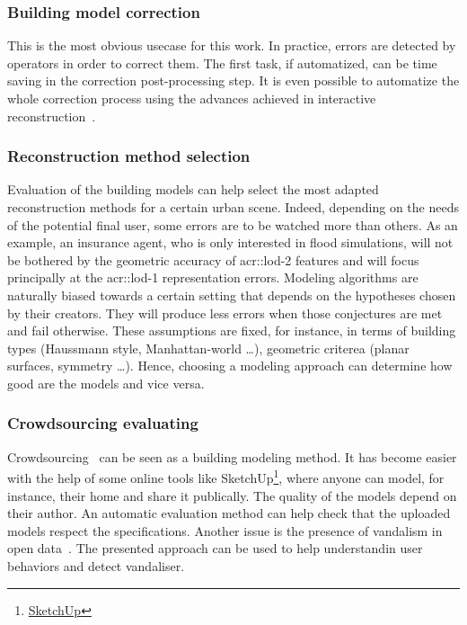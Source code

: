         \subsubsection{Building model correction}
            This is the most obvious usecase for this work.
            In practice, errors are detected by operators in order to correct them.
            The first task, if automatized, can be time saving in the correction post-processing step.
            It is even possible to automatize the whole correction process using the advances achieved in interactive reconstruction~\parencite{kowdle2011active}.

        \subsubsection{Reconstruction method selection}
            Evaluation of the building models can help select the most adapted reconstruction methods for a certain urban scene.
            Indeed, depending on the needs of the potential final user, some errors are to be watched more than others.
            As an example, an insurance agent, who is only interested in flood simulations, will not be bothered by the geometric accuracy of \gls{acr::lod}-2 features and will focus principally at the \gls{acr::lod}-1 representation errors.
            Modeling algorithms are naturally biased towards a certain setting that depends on the hypotheses chosen by their creators.
            They will produce less errors when those conjectures are met and fail otherwise.
            These assumptions are fixed, for instance, in terms of building types (Haussmann style, Manhattan-world \dots), geometric criterea (planar surfaces, symmetry \dots).
            Hence, choosing a modeling approach can determine how good are the models and vice versa.

        \subsubsection{Crowdsourcing evaluating}
            Crowdsourcing~\parencite{kovashka2016crowdsourcing} can be seen as a building modeling method.
            It has become easier with the help of some online tools like SketchUp\footnote{
                \href{https://www.sketchup.com}{SketchUp}
            }, where anyone can model, for instance, their home and share it publically.
            The quality of the models depend on their author.
            An automatic evaluation method can help check that the uploaded models respect the specifications.
            Another issue is the presence of vandalism in open data~\parencite{neis2012towards}.
            The presented approach can be used to help understandin user behaviors and detect vandaliser.

